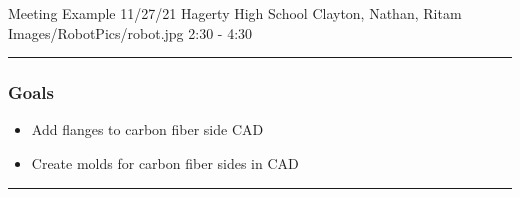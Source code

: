 \insertmeeting 
	{Meeting Example} 
	{11/27/21}
	{Hagerty High School}
	{Clayton, Nathan, Ritam}
	{Images/RobotPics/robot.jpg}
	{2:30 - 4:30}
	
\noindent\hfil\rule{\textwidth}{.4pt}\hfil
\subsubsection*{Goals}
\begin{itemize}
    \item Add flanges to carbon fiber side CAD
    \item Create molds for carbon fiber sides in CAD
 

\end{itemize} 

\noindent\hfil\rule{\textwidth}{.4pt}\hfil

